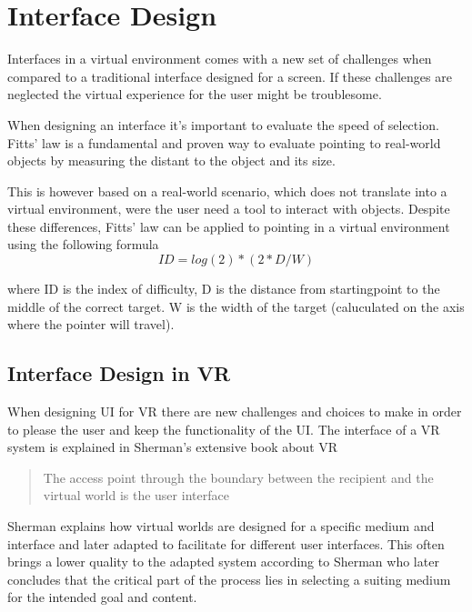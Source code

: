 \section{Interface Design}
Interfaces in a virtual environment comes with a new set of challenges when compared to a traditional interface designed for a screen. If these challenges are neglected the virtual experience for the user might be troublesome.

When designing an interface it's important to evaluate the speed of selection. Fitts' law is a fundamental and proven way to evaluate pointing to real-world objects by measuring the distant to the object and its size.\cite{interface:Fitts1954}

This is however based on a real-world scenario, which does not translate into a virtual environment, were the user need a tool to interact with objects. Despite these differences, Fitts' law can be applied to pointing in a virtual environment using the following formula  \cite{interface:card1978evaluation}
\begin{equation}
ID = log(2) * ( 2 * D / W )
\end{equation}

where ID is the index of difficulty, D is the distance from startingpoint to the middle of the correct target. W is the width of the target (caluculated  on the axis where the pointer will travel).

\subsection{Interface Design in VR}
When designing UI for VR there are new challenges and choices to make in order to please the user and keep the functionality of the UI. The interface of a VR system is explained in Sherman's extensive book about VR\cite{interface:sherman2002understanding}
 \begin{quote}
   The access point through the boundary between the recipient and the virtual world is the user interface
 \end{quote}
 Sherman explains how virtual worlds are designed for a specific medium and interface and later adapted to facilitate for different user interfaces. This often brings a lower quality to the adapted system according to Sherman who later concludes that the critical part of the process lies in selecting a suiting medium for the intended goal and content\cite{interface:sherman2002understanding}.

